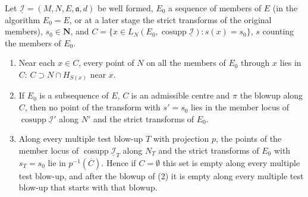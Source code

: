 \begin{theorem}
\label{bcalc:member-locus-level}
\mixedleanok
Let \(\underline{\mathcal I}=(M,N,E,\mathfrak a,d)\) be well formed, \(E_0\) a sequence of members of \(E\) (in the algorithm \(E_0=E\), or at a later stage the strict transforms of
the original members), \(s_0\in\mathbf N\), and \(C=\{x\in L_N(E_0,\operatorname{cosupp}\underline{\mathcal I}):s(x)=s_0\}\), \(s\) counting the members of \(E_0\).
\begin{enumerate}
\item Near each \(x\in C\), every point of \(N\) on all the members of \(E_0\) through \(x\) lies in \(C\): \(C\supset N\cap H_{S(x)}\) near \(x\).
\item If \(E_0\) is a subsequence of \(E\), \(C\) is an admissible centre and \(\pi\) the blowup along \(C\), then no point of the transform with \(s'=s_0\) lies in the member
locus of \(\operatorname{cosupp}\underline{\mathcal I}'\) along \(N'\) and the strict transforms of \(E_0\).
\item Along every multiple test blow-up \(T\) with projection \(p\), the points of the member locus of \(\operatorname{cosupp}\underline{\mathcal I}_T\) along \(N_T\) and the strict
transforms of \(E_0\) with \(s_T=s_0\) lie in \(p^{-1}(\overline C)\). Hence if \(C=\emptyset\) this set is empty along every multiple test blow-up, and after the blowup of (2)
it is empty along every multiple test blow-up that starts with that blowup.
\end{enumerate}
\end{theorem}
